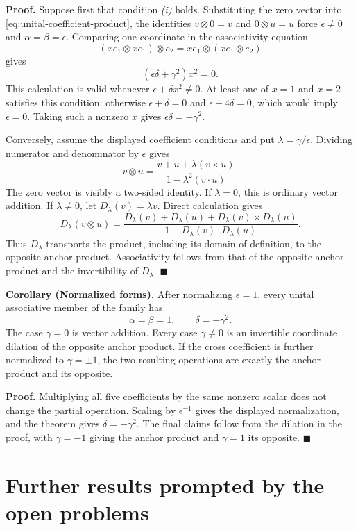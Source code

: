 \documentclass[11pt]{article}
\begin{document}
\smallskip
\noindent\textbf{Proof.}
Suppose first that condition \emph{(i)} holds.  Substituting the zero vector into
\eqref{eq:unital-coefficient-product}, the identities
\(v\otimes0=v\) and \(0\otimes u=u\) force
\(\epsilon\ne0\) and \(\alpha=\beta=\epsilon\).  Comparing one
coordinate in the associativity equation
\[
 (xe_1\otimes xe_1)\otimes e_2
   =xe_1\otimes(xe_1\otimes e_2)
\]
gives
\[
 (\epsilon\delta+\gamma^2)x^2=0.
\]
This calculation is valid whenever
\(\epsilon+\delta x^2\ne0\).  At least one of \(x=1\) and \(x=2\)
satisfies this condition: otherwise \(\epsilon+\delta=0\) and
\(\epsilon+4\delta=0\), which would imply \(\epsilon=0\).  Taking
such a nonzero \(x\) gives \(\epsilon\delta=-\gamma^2\).

Conversely, assume the displayed coefficient conditions and put
\(\lambda=\gamma/\epsilon\).  Dividing numerator and denominator by
\(\epsilon\) gives
\[
 v\otimes u=
 \frac{v+u+\lambda(v\times u)}
      {1-\lambda^2(v\mathbin{\cdot}u)}.
\]
The zero vector is visibly a two-sided identity.  If \(\lambda=0\), this is
ordinary vector addition.  If \(\lambda\ne0\), let
\(D_\lambda(v)=\lambda v\).  Direct calculation gives
\[
 D_\lambda(v\otimes u)=
 \frac{D_\lambda(v)+D_\lambda(u)
       +D_\lambda(v)\times D_\lambda(u)}
      {1-D_\lambda(v)\mathbin{\cdot}D_\lambda(u)}.
\]
Thus \(D_\lambda\) transports the product, including its domain of
definition, to the opposite anchor product.  Associativity follows from that
of the opposite anchor product and the invertibility of \(D_\lambda\).
\hfill\(\blacksquare\)

\medskip
\noindent\textbf{Corollary (Normalized forms).}
After normalizing \(\epsilon=1\), every unital associative member of the
family has
\[
 \alpha=\beta=1,\qquad \delta=-\gamma^2.
\]
The case \(\gamma=0\) is vector addition.  Every case \(\gamma\ne0\) is an
invertible coordinate dilation of the opposite anchor product.  If the cross
coefficient is further normalized to \(\gamma=\pm1\), the two resulting
operations are exactly the anchor product and its opposite.

\smallskip
\noindent\textbf{Proof.}
Multiplying all five coefficients by the same nonzero scalar does not change
the partial operation.  Scaling by \(\epsilon^{-1}\) gives the displayed
normalization, and the theorem gives \(\delta=-\gamma^2\).  The final claims
follow from the dilation in the proof, with \(\gamma=-1\) giving the anchor
product and \(\gamma=1\) its opposite. \hfill\(\blacksquare\)

\section{Further results prompted by the open problems}
\end{document}
